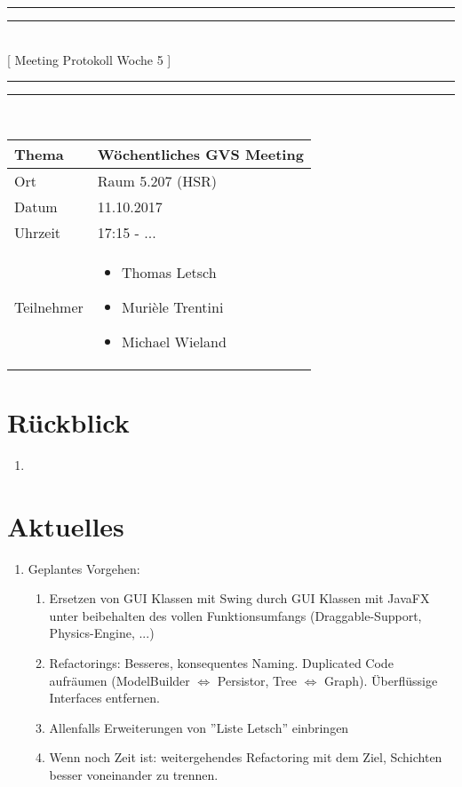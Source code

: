 \documentclass[11pt, a4paper,oneside]{scrartcl}
\begin{document}
\centering
\rule{\textwidth}{1.6pt}\vspace*{-\baselineskip}\vspace*{2pt} %
\rule{\textwidth}{0.4pt}\\[\baselineskip] %
{\LARGE [ Meeting Protokoll Woche 5 ]}\\[0.2\baselineskip] %
\rule{\textwidth}{0.4pt}\vspace*{-\baselineskip}\vspace{3.2pt} %
\rule{\textwidth}{1.6pt}\\[2\baselineskip] %

\begin{tabu} to \linewidth {l X }
	\toprule
	\textbf{Thema} & \textbf{Wöchentliches GVS Meeting} \\
	\midrule
	Ort & Raum 5.207 (HSR) \\
	Datum & 11.10.2017 \\
	Uhrzeit & 17:15 - ... \\
	Teilnehmer & 
	\begin{minipage}[t]{\textwidth}
	  	\begin{itemize}
	  		\item Thomas Letsch
			\item Murièle Trentini
			\item Michael Wieland
	  	\end{itemize}
	\end{minipage}
	\\
	\bottomrule
\end{tabu}


\section{Rückblick}
\begin{enumerate}
	\item 
\end{enumerate}

\section{Aktuelles}
\begin{enumerate}
	\item Geplantes Vorgehen:
	\begin{enumerate}
		\item Ersetzen von GUI Klassen mit Swing durch GUI Klassen mit JavaFX unter beibehalten des vollen Funktionsumfangs (Draggable-Support, Physics-Engine, ...)
		\item Refactorings: Besseres, konsequentes Naming. Duplicated Code aufräumen (ModelBuilder $\Leftrightarrow$ Persistor, Tree $\Leftrightarrow$ Graph). Überflüssige Interfaces entfernen.
		\item Allenfalls Erweiterungen von ''Liste Letsch'' einbringen
		\item Wenn noch Zeit ist: weitergehendes Refactoring mit dem Ziel, Schichten besser voneinander zu trennen.
	\end{enumerate}
\end{enumerate}
\end{document}
